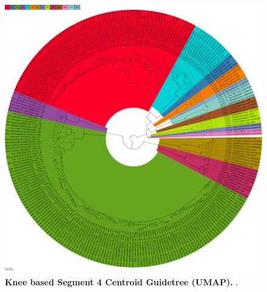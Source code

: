 \begin{figure}[!hbt]
    \centering
    \includegraphics[width=\dimexpr\textwidth-2\fboxsep-2\fboxrule,fbox]{UMAP/Guidetree_segment_4_H_Centroid.pdf}
    \caption[Knee based Segment 4 Centroid Guidetree (\Acrshort{UMAP})]{\textbf{Knee based Segment 4 Centroid Guidetree (\Acrshort{UMAP}).} .}
    \label{fig:UMAP_Guidetree_Centroid_4}
\end{figure}

